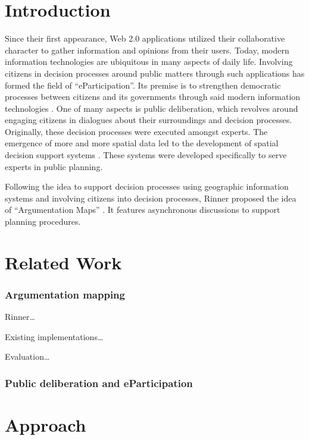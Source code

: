 \documentclass{sigchi}
\begin{document}
\section{Introduction}
Since their first appearance, Web 2.0 applications utilized their collaborative character to gather information and opinions from their users. Today, modern information technologies are ubiquitous in many aspects of daily life. Involving citizens in decision processes around public matters through such applications has formed the field of ``eParticipation''. Its premise is to strengthen democratic processes between citizens and its governments through said modern information technologies \cite{Saebo_eParticipation, Medaglia2012_eParticipation}. One of many aspects is public deliberation, which revolves around engaging citizens in dialogues about their surroundings and decision processes. Originally, these decision processes were executed amongst experts. The emergence of more and more spatial data led to the development of spatial decision support systems \cite{densham_sdss}. These systems were developed specifically to serve experts in public planning.

Following the idea to support decision processes using geographic information systems and involving citizens into decision processes, Rinner proposed the idea of ``Argumentation Maps'' \cite{Rinner_ArgumentationMaps}. It features asynchronous discussions to support planning procedures. 


\section{Related Work}

\subsubsection{Argumentation mapping}
Rinner\cite{Rinner_ArgumentationMaps}\dots

Existing implementations\dots

Evaluation\dots
\subsubsection{Public deliberation and eParticipation}


\section{Approach}
\end{document}
